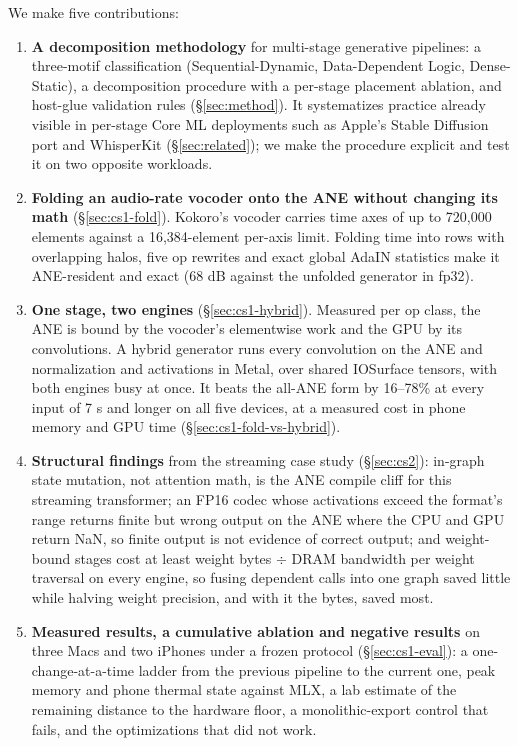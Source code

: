 \documentclass[11pt]{article}
\begin{document}
We make five contributions:

\begin{enumerate}[leftmargin=*]
\item \textbf{A decomposition methodology} for multi-stage generative pipelines: a three-motif classification (Sequential-Dynamic, Data-Dependent Logic, Dense-Static), a decomposition procedure with a per-stage placement ablation, and host-glue validation rules (\S\ref{sec:method}). It systematizes practice already visible in per-stage Core ML deployments such as Apple's Stable Diffusion port and WhisperKit (\S\ref{sec:related}); we make the procedure explicit and test it on two opposite workloads.

\item \textbf{Folding an audio-rate vocoder onto the ANE without changing its math} (\S\ref{sec:cs1-fold}). Kokoro's vocoder carries time axes of up to 720,000 elements against a 16,384-element per-axis limit. Folding time into rows with overlapping halos, five op rewrites and exact global AdaIN statistics make it ANE-resident and exact (68 dB against the unfolded generator in fp32).

\item \textbf{One stage, two engines} (\S\ref{sec:cs1-hybrid}). Measured per op class, the ANE is bound by the vocoder's elementwise work and the GPU by its convolutions. A hybrid generator runs every convolution on the ANE and normalization and activations in Metal, over shared IOSurface tensors, with both engines busy at once. It beats the all-ANE form by 16--78\% at every input of 7 s and longer on all five devices, at a measured cost in phone memory and GPU time (\S\ref{sec:cs1-fold-vs-hybrid}).

\item \textbf{Structural findings} from the streaming case study (\S\ref{sec:cs2}): in-graph state mutation, not attention math, is the ANE compile cliff for this streaming transformer; an FP16 codec whose activations exceed the format's range returns finite but wrong output on the ANE where the CPU and GPU return NaN, so finite output is not evidence of correct output; and weight-bound stages cost at least weight bytes $\div$ DRAM bandwidth per weight traversal on every engine, so fusing dependent calls into one graph saved little while halving weight precision, and with it the bytes, saved most.

\item \textbf{Measured results, a cumulative ablation and negative results} on three Macs and two iPhones under a frozen protocol (\S\ref{sec:cs1-eval}): a one-change-at-a-time ladder from the previous pipeline to the current one, peak memory and phone thermal state against MLX, a lab estimate of the remaining distance to the hardware floor, a monolithic-export control that fails, and the optimizations that did not work.
\end{enumerate}
\end{document}
